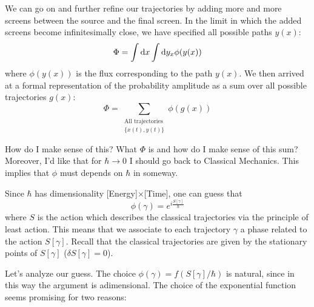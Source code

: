 \documentclass[../main/main.tex]{subfiles}
\begin{document}
We can go on and further refine our trajectories by adding more and more screens between the source and the final screen. In the limit in which the added screens become infinitesimally close, we have specified all possible paths $y(x)$:
\[\Phi=\int\textup{d} x\int \textup{d} y_x\phi(y(x))\]
where $\phi(y(x))$ is the flux corresponding to the path $y(x)$. 
We then arrived at a formal representation of the probability amplitude as a sum over all possible trajectories $g(x)$:
\begin{equation}\label{eqn:sketch-total-phase-trajectory}
\Phi=\sum_{\substack{\text{All trajectories}\\\{x(t),y(t)\}}}\phi(g(x))
\end{equation}

How do I make sense of this? What $\Phi$ is and how do I make sense of this sum?
Moreover, I'd like that for $\hbar\to0$ I should go back to Classical Mechanics. This implies that $\phi$ must depends on $\hbar$ in someway.

Since $\hbar$ has dimensionality [Energy]$\times$[Time], one can guess that 
\begin{equation}\label{eqn:path-exp-formula}
\phi(\gamma)=e^{i\frac{S[\gamma]}{\hbar}}
\end{equation}
where $S$ is the action which describes the classical trajectories via the principle of least action. This means that we associate to each trajectory $\gamma$ a phase related to the action $S[\gamma]$. Recall that the classical trajectories are given by the stationary points of $S[\gamma]$ ($\delta S[\gamma]=0$).
 
Let's analyze our guess. The choice $\phi(\gamma)=f(S[\gamma]/\hbar)$ is natural, since in this way the argument is adimensional. The choice of the exponential function seems promising for two reasons:
\end{document}
